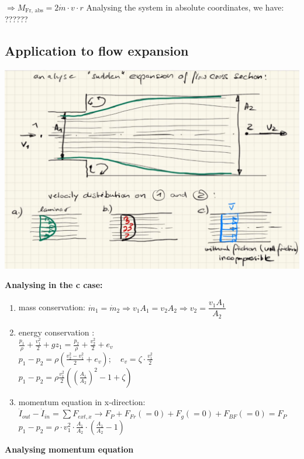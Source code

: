 \documentclass{article}
\begin{document}
$\Longrightarrow M_{\text{Fr, abs}} = 2\dot{m} \cdot v \cdot r$
Analysing the system in absolute coordinates, we have:
??????

\subsection{Application to flow expansion}
\begin{center}
    \includegraphics[width=.8\textwidth]{media/flow_expansion.png}
\end{center}

\textbf{Analysing in the c case:}
\begin{enumerate}
    \item mass conservation: $\dot{m}_1 = \dot{m}_2 \Rightarrow v_1A_1 = v_2A_2 \Rightarrow v_2=\dfrac{v_1A_1}{A_2}$
    \item energy conservation \textrightarrow{}:\\
        $\frac{p_1}{\rho}+\frac{v_1^2}{2}+gz_1 = \frac{p_2}{\rho}+\frac{v_2^2}{2}+e_v$\\[1ex]
        $p_1-p_2 = \rho\left(\frac{v_2^2 - v_1^2}{2} + e_v\right);\quad e_v = \zeta\cdot\frac{v_1^2}{2}$\\[1ex]
        $p_1-p_2 = \rho\frac{v_1^2}{2}\left(\left(\frac{A_1}{A_2}\right)^2-1+\zeta\right)$
    \item momentum equation in x-direction:\\
        $\dot{I}_{out} - \dot{I}_{in} = \sum F_{ext,x} \rightarrow F_P + F_{Fr} (=0) + F_g (=0) + F_{BF} (=0) = F_P$\\
        $p_1 - p_2 = \rho\cdot v_1^2\cdot \frac{A_1}{A_2}\cdot\left(\frac{A_1}{A_2}-1\right)$
\end{enumerate}

\textbf{Analysing momentum equation}
\end{document}
